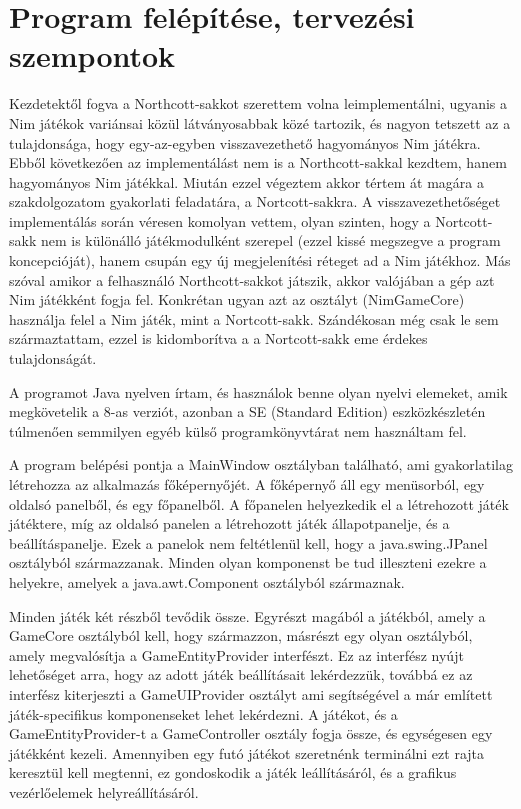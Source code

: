 \section{Program felépítése, tervezési szempontok}
Kezdetektől fogva a Northcott-sakkot szerettem volna leimplementálni, ugyanis a Nim játékok variánsai közül látványosabbak közé tartozik, és nagyon tetszett az a tulajdonsága, hogy egy-az-egyben visszavezethető hagyományos Nim játékra. Ebből következően az implementálást nem is a Northcott-sakkal kezdtem, hanem hagyományos Nim játékkal. Miután ezzel végeztem akkor tértem át magára a szakdolgozatom gyakorlati feladatára, a Nortcott-sakkra. A visszavezethetőséget implementálás során véresen komolyan vettem, olyan szinten, hogy a Nortcott-sakk nem is különálló játékmodulként szerepel (ezzel kissé megszegve a program koncepcióját), hanem csupán egy új megjelenítési réteget ad a Nim játékhoz. Más szóval amikor a felhasználó Northcott-sakkot játszik, akkor valójában a gép azt Nim játékként fogja fel. Konkrétan ugyan azt az osztályt (NimGameCore) használja felel a Nim játék, mint a Nortcott-sakk. Szándékosan még csak le sem származtattam, ezzel is kidomborítva a a Nortcott-sakk eme érdekes tulajdonságát.\ujsor

A programot Java nyelven írtam, és használok benne olyan nyelvi elemeket, amik megkövetelik a 8-as verziót, azonban a SE (Standard Edition) eszközkészletén túlmenően semmilyen egyéb külső programkönyvtárat nem használtam fel.\ujsor

A program belépési pontja a MainWindow osztályban található, ami gyakorlatilag létrehozza az alkalmazás főképernyőjét. A főképernyő áll egy menüsorból, egy oldalsó panelből, és egy főpanelből. A főpanelen helyezkedik el a létrehozott játék játéktere, míg az oldalsó panelen a létrehozott játék állapotpanelje, és a beállításpanelje. Ezek a panelok nem feltétlenül kell, hogy a java.swing.JPanel osztályból származzanak. Minden olyan komponenst be tud illeszteni ezekre a helyekre, amelyek a java.awt.Component osztályból származnak.\ujsor

Minden játék két részből tevődik össze. Egyrészt magából a játékból, amely a GameCore osztályból kell, hogy származzon, másrészt egy olyan osztályból, amely megvalósítja a GameEntityProvider interfészt. Ez az interfész nyújt lehetőséget arra, hogy az adott játék beállításait lekérdezzük, továbbá ez az interfész kiterjeszti a GameUIProvider osztályt ami segítségével a már említett játék-specifikus komponenseket lehet lekérdezni. A játékot, és a GameEntityProvider-t a GameController osztály fogja össze, és egységesen egy játékként kezeli. Amennyiben egy futó játékot szeretnénk terminálni ezt rajta keresztül kell megtenni, ez gondoskodik a játék leállításáról, és a grafikus vezérlőelemek helyreállításáról.\ujsor

